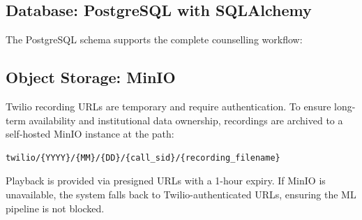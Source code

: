 \subsection{Database: PostgreSQL with SQLAlchemy}

The PostgreSQL schema supports the complete counselling workflow:

\begin{table}[h]
\centering
\caption{Key database tables.}
\label{tab:db_schema}
\end{table}

\subsection{Object Storage: MinIO}

Twilio recording URLs are temporary and require authentication. To ensure long-term availability and institutional data ownership, recordings are archived to a self-hosted MinIO instance at the path:
\begin{verbatim}
twilio/{YYYY}/{MM}/{DD}/{call_sid}/{recording_filename}
\end{verbatim}

Playback is provided via presigned URLs with a 1-hour expiry. If MinIO is unavailable, the system falls back to Twilio-authenticated URLs, ensuring the ML pipeline is not blocked.

